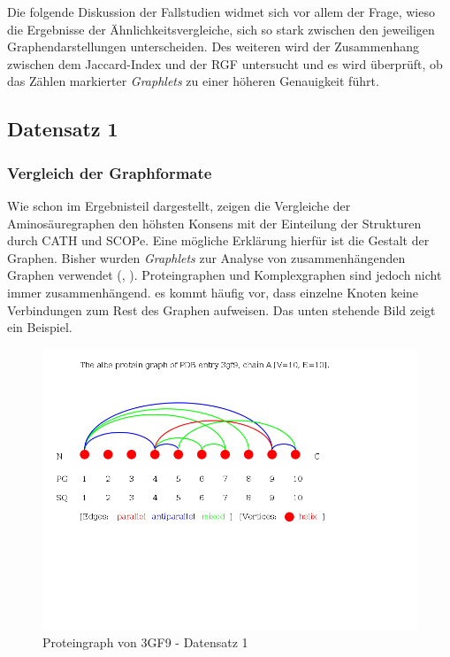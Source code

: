 \documentclass{report}
\begin{document}
Die folgende Diskussion der Fallstudien widmet sich vor allem der Frage, wieso die Ergebnisse der \"Ahnlichkeitsvergleiche, sich so stark zwischen den jeweiligen Graphendarstellungen unterscheiden.
Des weiteren wird der Zusammenhang zwischen dem Jaccard-Index und der RGF untersucht und es wird \"uberpr\"uft, ob das Z\"ahlen markierter \textit{Graphlets} zu einer h\"oheren Genauigkeit f\"uhrt.

\subsection{Datensatz 1}
\subsubsection{Vergleich der Graphformate}

Wie schon im Ergebnisteil dargestellt, zeigen die Vergleiche der Aminos\"auregraphen den h\"ohsten Konsens mit der Einteilung der Strukturen durch CATH und SCOPe. Eine m\"ogliche Erkl\"arung hierf\"ur ist die Gestalt der Graphen. Bisher wurden \textit{Graphlets} zur Analyse von zusammenh\"angenden Graphen verwendet (\cite{sherv_graphlets}, \cite{graphletfrequency}).
Proteingraphen und Komplexgraphen sind jedoch nicht immer zusammenh\"angend. es kommt h\"aufig vor, dass einzelne Knoten keine Verbindungen zum Rest des Graphen aufweisen. Das unten stehende Bild zeigt ein Beispiel.

\begin{figure}[h!]
\includegraphics[scale=0.5]{3gf9_A_albe_PG.png}
\caption{Proteingraph von 3GF9 - Datensatz 1}
\end{figure}
\end{document}
